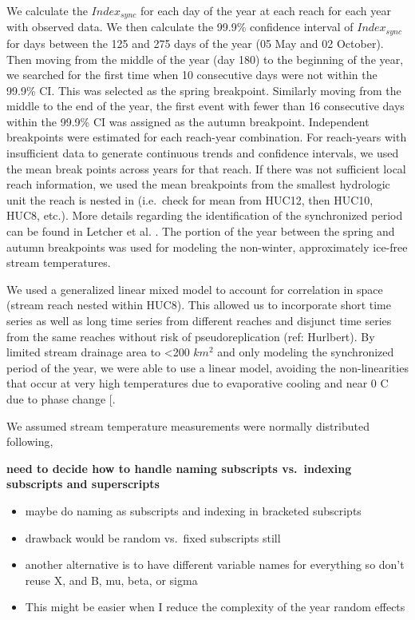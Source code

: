 \documentclass[]{article}
\providecommand{\tightlist}{%
  \setlength{\itemsep}{0pt}\setlength{\parskip}{0pt}}
\begin{document}
We calculate the \(Index_{sync}\) for each day of the year at each reach
for each year with observed data. We then calculate the 99.9\%
confidence interval of \(Index_{sync}\) for days between the 125 and 275
days of the year (05 May and 02 October). Then moving from the middle of
the year (day 180) to the beginning of the year, we searched for the
first time when 10 consecutive days were not within the 99.9\% CI. This
was selected as the spring breakpoint. Similarly moving from the middle
to the end of the year, the first event with fewer than 16 consecutive
days within the 99.9\% CI was assigned as the autumn breakpoint.
Independent breakpoints were estimated for each reach-year combination.
For reach-years with insufficient data to generate continuous trends and
confidence intervals, we used the mean break points across years for
that reach. If there was not sufficient local reach information, we used
the mean breakpoints from the smallest hydrologic unit the reach is
nested in (i.e.~check for mean from HUC12, then HUC10, HUC8, etc.). More
details regarding the identification of the synchronized period can be
found in Letcher et al. \citeyearpar{Letcher2016t}. The portion of the
year between the spring and autumn breakpoints was used for modeling the
non-winter, approximately ice-free stream temperatures.

We used a generalized linear mixed model to account for correlation in
space (stream reach nested within HUC8). This allowed us to incorporate
short time series as well as long time series from different reaches and
disjunct time series from the same reaches without risk of
pseudoreplication (ref: Hurlbert). By limited stream drainage area to
\textless{}200 \(km^2\) and only modeling the synchronized period of the
year, we were able to use a linear model, avoiding the non-linearities
that occur at very high temperatures due to evaporative cooling and near
0 C due to phase change {[}\citet{Mohseni1999}.

We assumed stream temperature measurements were normally distributed
following,

\textbf{need to decide how to handle naming subscripts vs.~indexing
subscripts and superscripts}

\begin{itemize}
\tightlist
\item
  maybe do naming as subscripts and indexing in bracketed subscripts
\item
  drawback would be random vs.~fixed subscripts still
\item
  another alternative is to have different variable names for everything
  so don't reuse X, and B, mu, beta, or sigma
\item
  This might be easier when I reduce the complexity of the year random
  effects
\end{itemize}
\end{document}
